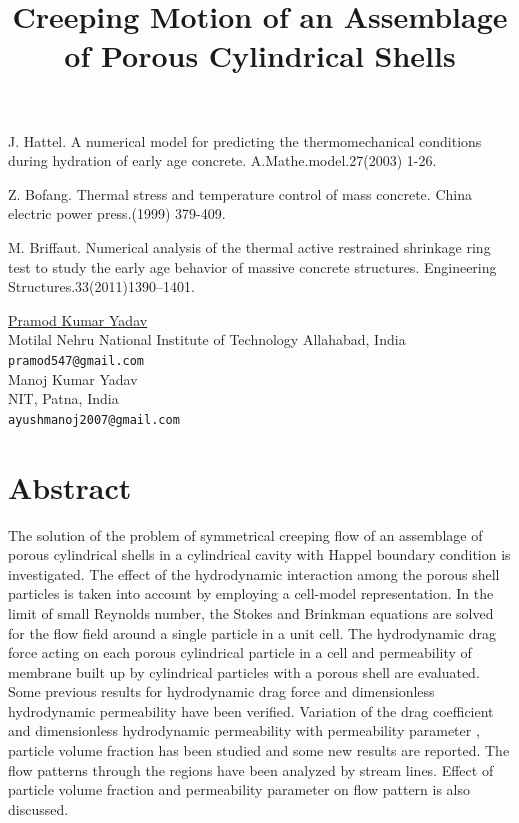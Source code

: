 \documentclass[article,A4,11pt]{llncs}%
\begin{document}

\begin{thebibliography}{10}
{\sc J. Hattel}. {A numerical model for predicting the thermomechanical conditions during hydration of early age concrete}. A.Mathe.model.27(2003) 1-26.

{\sc Z. Bofang}. {Thermal stress and temperature control of mass concrete}. China electric power press.(1999) 379-409.

{\sc M. Briffaut}. {Numerical analysis of the thermal active restrained shrinkage ring test to study the early age behavior of massive concrete structures}. Engineering Structures.33(2011)1390–1401.
\end{thebibliography}

\title{Creeping Motion of an Assemblage of Porous Cylindrical Shells}
 \author{} \institute{}
\maketitle
\begin{center}
{\large \underline{Pramod Kumar Yadav}}\\
Motilal Nehru National Institute of Technology Allahabad, India\\
{\tt pramod547@gmail.com}
\\ \vspace{4mm}
{\large Manoj Kumar Yadav}\\
NIT, Patna, India\\
{\tt ayushmanoj2007@gmail.com}
\end{center}

\section*{Abstract}
The solution of the problem of symmetrical creeping flow of an assemblage of porous cylindrical shells in a cylindrical cavity with Happel boundary  condition is investigated. The effect of the hydrodynamic interaction among the porous shell particles is taken into account by employing a cell-model representation. In the limit of small Reynolds number, the Stokes and Brinkman equations are solved for the flow field around a single particle in a unit cell. The hydrodynamic drag force acting on each porous cylindrical particle in a cell and permeability of membrane built up by cylindrical particles with a porous shell are evaluated. Some previous results for hydrodynamic drag force and dimensionless hydrodynamic permeability have been verified. Variation of the drag coefficient and dimensionless hydrodynamic permeability with permeability parameter , particle volume fraction   has been studied and some new results are reported. The flow patterns through the regions have been analyzed by stream lines. Effect of particle volume fraction  and permeability parameter on flow pattern is also discussed.
\end{document}
